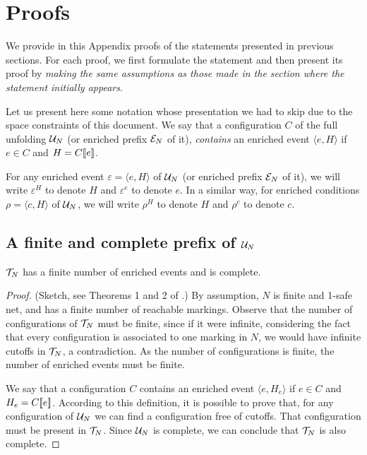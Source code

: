 
\appendix

\section{Proofs}
\label{ape:proofs}

We provide in this Appendix proofs of the statements presented in previous
sections.  For each proof, we first formulate the statement and then present
its proof by \emph{making the same assumptions as those made in the section
where the statement initially appears}.

Let us present here some notation whose presentation we had to skip due to the
space constraints of this document.  We say that a configuration $C$ of the
full unfolding $\mathcal{U}_{N}$ (or enriched prefix $\mathcal{E}_{N}$ of it), \emph{contains} an
enriched event $\langle e, H \rangle$ if $e \in C$ and $H = C [\![ e]\!]$.

For any enriched event $\varepsilon = \langle e, H \rangle$ of $\mathcal{U}_{N}$ (or
enriched prefix $\mathcal{E}_{N}$ of it), we will write $\varepsilon^H$ to denote $H$
and $\varepsilon^e$ to denote $e$.  In a similar way, for enriched conditions
$\rho = \langle c, H \rangle$ of $\mathcal{U}_{N}$, we will write $\rho^H$ to denote $H$
and $\rho^c$ to denote $c$.

\subsection{A finite and complete prefix of $\mathcal{U}_{N}$}

\setcounter{theorem}{8}
\begin{theorem}
$\mathcal{T}_{N}$ has a finite number of enriched events and is complete.
\end{theorem}

\begin{proof}
(Sketch, see Theorems 1 and 2 of .) By assumption, $N$ is finite
and 1-safe net, and has a finite number of reachable markings.  Observe that
the number of configurations of $\mathcal{T}_{N}$ must be finite, since if it were
infinite, considering the fact that every configuration is associated to one
marking in $N$, we would have infinite cutoffs in $\mathcal{T}_{N}$, a contradiction.
As the number of configurations is finite, the number of enriched events must
be finite.

We say that a configuration $C$ contains an enriched event $\langle e, H_e
\rangle$ if $e \in C$ and $H_e = C [\![ e]\!]$.  According to this definition, it
is possible to prove that, for any configuration of $\mathcal{U}_{N}$ we can find a
configuration free of cutoffs.  That configuration must be present in $\mathcal{T}_{N}$.  Since $\mathcal{U}_{N}$ is complete, we can conclude that $\mathcal{T}_{N}$ is also
complete.
\end{proof}

